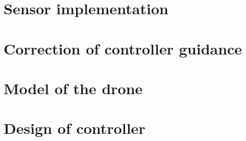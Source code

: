 \chapter{Sensor implementation}\label{ch:sensor}
    
    
\chapter{Correction of controller guidance}\label{ch:controller_implementation}
    
\chapter{Model of the drone}\label{ch:model_drone}
    
\chapter{Design of controller}
    
%
%

%         
%         
%         

%
\printbibliography[heading=bibintoc]
\label{bib:mybiblio}
\appendix
%


